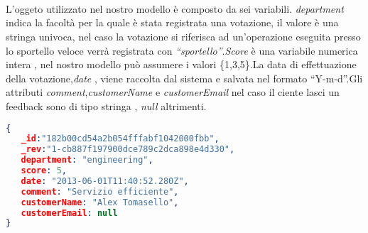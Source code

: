 \\\\\\L'oggeto utilizzato nel nostro modello è composto da sei variabili.
\emph{department} indica la facoltà per la quale è stata registrata una
votazione, il valore è una stringa univoca, nel caso la votazione si
riferisca ad un'operazione eseguita presso lo sportello veloce verrà registrata
con \emph{``sportello''}.\emph{Score} è una variabile numerica intera , nel
nostro modello può assumere i valori \{1,3,5\}.La data di effettuazione della
votazione,\emph{date} , viene raccolta dal sistema e salvata nel formato
``Y-m-d''.Gli attributi \emph{comment},\emph{customerName} e
\emph{customerEmail} nel caso il ciente lasci un feedback sono di tipo stringa , \emph{null} altrimenti. 
\\
\begin{lstlisting}[language=json] 
{ 
   _id:"182b00cd54a2b054fffabf1042000fbb", 
   _rev:"1-cb887f197900dce789c2dca898e4d330", 
   department: "engineering",
   score: 5,
   date: "2013-06-01T11:40:52.280Z",
   comment: "Servizio efficiente",
   customerName: "Alex Tomasello",
   customerEmail: null
}
\end{lstlisting} 
